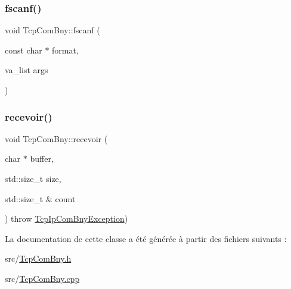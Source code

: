 \mbox{\label{classTcpComBny_a06926f8731f185ab970fa0cb687bdf28}} 
\subsubsection{\texorpdfstring{fscanf()}{fscanf()}\hspace{0.1cm}{\footnotesize\ttfamily [2/2]}}
{\footnotesize\ttfamily void Tcp\+Com\+Bny\+::fscanf (\begin{DoxyParamCaption}\item[{const char $\ast$}]{format,  }\item[{va\+\_\+list}]{args }\end{DoxyParamCaption})}

\mbox{\label{classTcpComBny_a1f1002ef6d3d9cfe4cfcef4cfa3ab020}} 
\subsubsection{\texorpdfstring{recevoir()}{recevoir()}}
{\footnotesize\ttfamily void Tcp\+Com\+Bny\+::recevoir (\begin{DoxyParamCaption}\item[{char $\ast$}]{buffer,  }\item[{std\+::size\+\_\+t}]{size,  }\item[{std\+::size\+\_\+t \&}]{count }\end{DoxyParamCaption}) throw  \hyperlink{classTcpIpComBnyException}{Tcp\+Ip\+Com\+Bny\+Exception}) }



La documentation de cette classe a été générée à partir des fichiers suivants \+:\begin{DoxyCompactItemize}
\item 
src/\hyperlink{TcpComBny_8h}{Tcp\+Com\+Bny.\+h}\item 
src/\hyperlink{TcpComBny_8cpp}{Tcp\+Com\+Bny.\+cpp}\end{DoxyCompactItemize}
